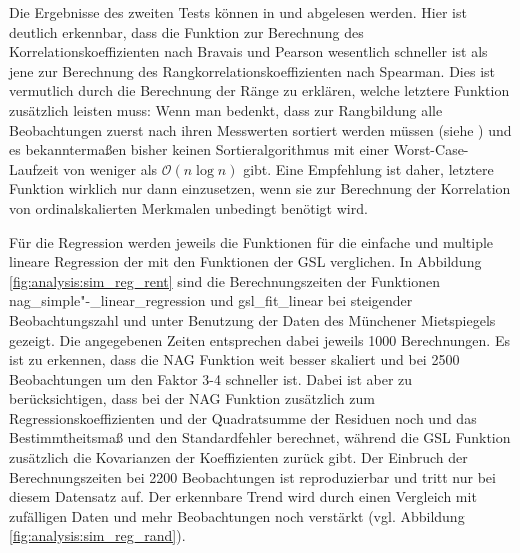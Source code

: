 Die Ergebnisse des zweiten Tests können in  und  abgelesen werden. Hier ist deutlich erkennbar, dass die Funktion zur Berechnung des Korrelationskoeffizienten nach Bravais und Pearson wesentlich schneller ist als jene zur Berechnung des Rangkorrelationskoeffizienten nach Spearman. Dies ist vermutlich durch die Berechnung der Ränge zu erklären, welche letztere Funktion zusätzlich leisten muss: Wenn man bedenkt, dass zur Rangbildung alle Beobachtungen zuerst nach ihren Messwerten sortiert werden müssen (siehe ) und es bekanntermaßen bisher keinen Sortieralgorithmus mit einer Worst-Case-Laufzeit von weniger als $\mathcal{O}(n \log{n})$ gibt. Eine Empfehlung ist daher, letztere Funktion wirklich nur dann einzusetzen, wenn sie zur Berechnung der Korrelation von ordinalskalierten Merkmalen unbedingt benötigt wird.

Für die Regression werden jeweils die Funktionen für die einfache und multiple lineare Regression der \naglib mit den Funktionen der GSL verglichen.
In Abbildung \ref{fig:analysis:sim_reg_rent} sind die Berechnungszeiten der Funktionen nag\_simple"-\_linear\_regression und gsl\_fit\_linear bei steigender Beobachtungszahl und unter Benutzung der Daten des Münchener Mietspiegels gezeigt.
Die angegebenen Zeiten entsprechen dabei jeweils 1000 Berechnungen.
Es ist zu erkennen, dass die NAG Funktion weit besser skaliert und bei 2500 Beobachtungen um den Faktor 3-4 schneller ist.
Dabei ist aber zu berücksichtigen, dass bei der NAG Funktion zusätzlich zum Regressionskoeffizienten und der Quadratsumme der Residuen noch und das Bestimmtheitsmaß und den Standardfehler berechnet, während die GSL Funktion zusätzlich die Kovarianzen der Koeffizienten zurück gibt.
Der Einbruch der Berechnungszeiten bei 2200 Beobachtungen ist reproduzierbar und tritt nur bei diesem Datensatz auf.
Der erkennbare Trend wird durch einen Vergleich mit zufälligen Daten und mehr Beobachtungen noch verstärkt (vgl. Abbildung \ref{fig:analysis:sim_reg_rand}).

